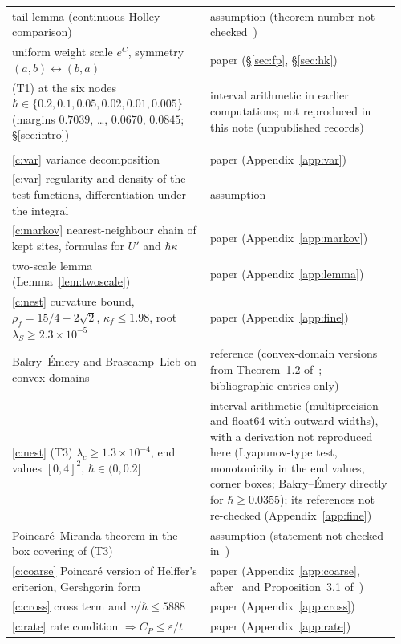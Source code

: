 \documentclass[11pt,a4paper]{article}
\theoremstyle{definition}
\theoremstyle{remark}
\newcommand{\hk}{\hbar\kappa}
\begin{document}
\begin{table}[!htbp]
\begin{tabular}{@{}>{\raggedright\arraybackslash}p{0.49\linewidth}>{\raggedright\arraybackslash}p{0.47\linewidth}@{}}
tail lemma (continuous Holley comparison) & assumption (theorem number not checked~\cite{Ho})\\
uniform weight scale $e^{C}$, symmetry $(a,b)\leftrightarrow(b,a)$ & paper (\S\ref{sec:fp}, \S\ref{sec:hk})\\
(T1) at the six nodes $\hbar\in\{0.2,0.1,0.05,0.02,0.01,0.005\}$ (margins $0.7039$, \dots, $0.0670$, $0.0845$; \S\ref{sec:intro}) & interval arithmetic in earlier computations; not reproduced in this note (unpublished records)\\\midrule
\multicolumn{2}{@{}l}{\emph{The construction of \S\ref{sec:construction} (valid for $\hbar\in(0,0.2]$)}}\\
\ref{c:var} variance decomposition & paper (Appendix~\ref{app:var})\\
\ref{c:var} regularity and density of the test functions, differentiation under the integral & assumption\\
\ref{c:markov} nearest-neighbour chain of kept sites, formulas for $U'$ and $\hk$ & paper (Appendix~\ref{app:markov})\\
two-scale lemma (Lemma~\ref{lem:twoscale}) & paper (Appendix~\ref{app:lemma})\\
\ref{c:nest} curvature bound, $\rho_f=15/4-2\sqrt2$, $\kappa_f\le1.98$, root $\lambda_S\ge2.3\times10^{-5}$ & paper (Appendix~\ref{app:fine})\\
Bakry--Émery and Brascamp--Lieb on convex domains & reference (convex-domain versions from Theorem~1.2 of~\cite{KM}; \cite{BE,BL} bibliographic entries only)\\
\ref{c:nest} (T3) $\lambda_c\ge1.3\times10^{-4}$, end values $[0,4]^2$, $\hbar\in(0,0.2]$ & interval arithmetic (multiprecision and float64 with outward widths), with a derivation not reproduced here (Lyapunov-type test, monotonicity in the end values, corner boxes; Bakry--Émery directly for $\hbar\ge0.0355$); its references not re-checked (Appendix~\ref{app:fine})\\
Poincaré--Miranda theorem in the box covering of (T3) & assumption (statement not checked in~\cite{Ku})\\
\ref{c:coarse} Poincaré version of Helffer's criterion, Gershgorin form & paper (Appendix~\ref{app:coarse}, after~\cite{He} and Proposition~3.1 of~\cite{Le})\\
\ref{c:cross} cross term and $v/\hbar\le5888$ & paper (Appendix~\ref{app:cross})\\
\ref{c:rate} rate condition $\Rightarrow C_P\le\varepsilon/t$ & paper (Appendix~\ref{app:rate})\\

\end{tabular}
\end{table}
\end{document}
